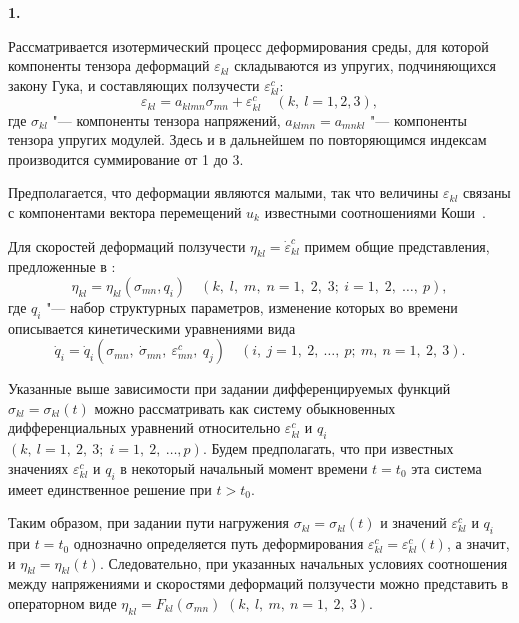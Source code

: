 \date{16/VII/2014}




\makerutitle


\hypertarget{ts:1}{{\bf 1.}}
Рассматривается изотермический процесс деформирования среды, для которой компоненты тензора деформаций $\varepsilon_{kl}$ складываются из упругих, подчиняющихся закону Гука, и составляющих ползучести $\varepsilon_{kl}^c$: 
\begin{equation}
\label{ts:(1.1)}
\varepsilon_{kl}=a_{klmn}\sigma_{mn}+\varepsilon_{kl}^c\quad  (k,\:l=1, 2, 3), 
\end{equation}
где $\sigma_{kl}$ "--- компоненты тензора напряжений, $a_{klmn}=a_{mnkl}$ "--- компоненты тензора упругих модулей. 
Здесь и в дальнейшем по повторяющимся индексам производится суммирование от 1 до 3.

Предполагается, что деформации являются малыми, так что величины $\varepsilon_{kl}$ связаны с компонентами вектора перемещений $u_{k}$ известными соотношениями Коши~\cite{ts:Koiter}.

Для скоростей деформаций ползучести $\eta_{kl}=\dot{\varepsilon}_{kl}^{c}$  примем общие представления, предложенные в  \cite{ts:Rabotnov}: 
\begin{equation}
\label{ts:(1.2)}
\eta_{kl}=\eta_{kl}(\sigma_{mn},  q_{i})\quad  (k,\;l,\;m,\;n=1,\;2,\;3;\ i=1,\;2,\;\ldots,\:p),
\end{equation}
где $q_{i}$ "--- набор структурных параметров, изменение которых во времени описывается кинетическими уравнениями вида 
\begin{equation}
\label{ts:(1.3)}
\dot{q}_{i}=\dot{q}_{i} (\sigma_{mn} ,\:\dot{\sigma}_{mn},\:\varepsilon_{mn}^{c},\:q_{j})\quad  (i,\:j=1,\:2,\:\ldots,\:p;\ m,\:n=1,\:2,\:3).
\end{equation}

Указанные выше зависимости при задании дифференцируемых функций $\sigma_{kl}=\sigma_{kl}(t)$ 
можно рассматривать как систему обыкновенных дифференциальных уравнений относительно $\varepsilon_{kl}^c$ и $q_{i}$
$(k,\:l=1,\:2,\:3;\;i=1,\:2,\:\ldots,p)$. 
Будем предполагать, что при известных значениях $\varepsilon_{kl}^c$ и $q_{i}$ в некоторый начальный момент времени $t=t_{0}$ эта система имеет единственное решение при $t>t_{0}$.

Таким образом, при задании пути нагружения $\sigma_{kl}=\sigma_{kl}(t)$ и значений $\varepsilon_{kl}^c$ и $q_{i}$ при $t=t_{0}$ однозначно определяется путь деформирования $\varepsilon_{kl}^c=\varepsilon_{kl}^c(t)$, а значит, и $\eta_{kl}=\eta_{kl}(t)$. Следовательно, при указанных начальных условиях соотношения между напряжениями и скоростями деформаций ползучести можно представить в операторном виде $\eta_{kl}=F_{kl}(\sigma_{mn})$ $(k,\:l,\:m,\:n=1,\:2,\:3)$.

